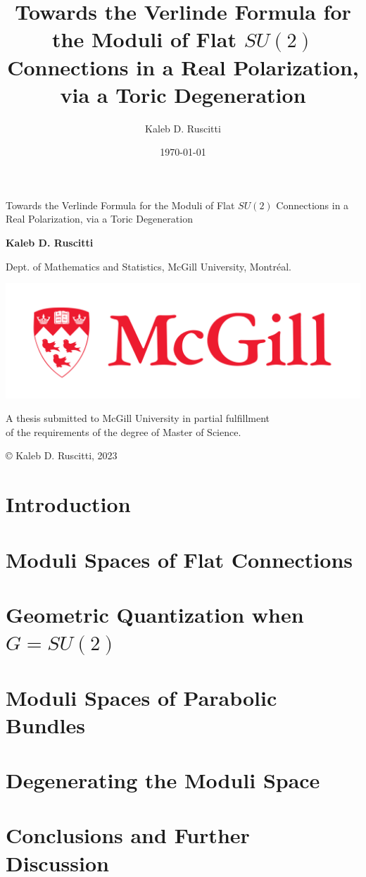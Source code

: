 \documentclass[]{report}
\title{Towards the Verlinde Formula for the Moduli of Flat $SU(2)$ Connections in a Real Polarization, via a Toric Degeneration}
\date{\today}
\author{Kaleb D. Ruscitti}
\numberwithin{theorem}{chapter}
\begin{document}
	
\begin{titlepage}
	\begin{center}
		\vspace*{1cm}
		
		{\Large Towards the Verlinde Formula for the Moduli of Flat $SU(2)$ Connections in a Real Polarization, via a Toric Degeneration}
		
		\vspace{2cm}
		\textbf{Kaleb D. Ruscitti}
		
		\vspace{0.5 cm}
		Dept. of Mathematics and Statistics, McGill University, Montréal.
		
		\vfill
		
		\includegraphics{mcgill_sig_red.png}
	
		
		A thesis submitted to McGill University in partial fulfillment \\
		 of the requirements of the degree of Master of Science.
		
		\vspace{0.5 cm}
		{\footnotesize © Kaleb D. Ruscitti, 2023}
	\end{center}
\end{titlepage}


\tableofcontents

\chapter{Introduction}
\label{s:intro}

\chapter{Moduli Spaces of Flat Connections}
\label{s:background}

\chapter{Geometric Quantization when $G=SU(2)$}
\label{s:jeffreyweitsman}

\chapter{Moduli Spaces of Parabolic Bundles}
\label{s:mastermoduli}

\chapter{Degenerating the Moduli Space}
\label{s:degeneration}


\chapter{Conclusions and Further Discussion}
\label{s:conclusions}


\pagebreak
\printbibliography
\end{document}
